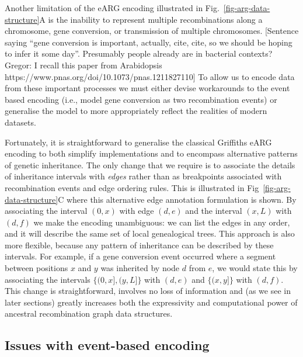 \documentclass{article}
\begin{document}
Another limitation of the eARG encoding illustrated in
Fig.~\ref{fig-arg-data-structure}A is the inability to represent
multiple recombinations along a chromosome, gene conversion,
or transmission of multiple chromosomes.
[Sentence saying ``gene conversion is important, actually, cite, cite,
so we should be hoping to infer it some day''. Presumably people
already are in bacterial contexts? Gregor: I recall this paper from
Arabidopsis https://www.pnas.org/doi/10.1073/pnas.1211827110]
To allow us to encode data from these important processes we
must either devise workarounds to the event based encoding
(i.e., model gene conversion as two recombination events) or
generalise the model to more appropriately reflect the realities
of modern datasets.

Fortunately, it is straightforward to generalise the classical Griffiths
eARG encoding to both simplify implementations and to encompass
alternative patterns of genetic inheritance.
The only change that we require is to associate
the details of inheritance intervals with \emph{edges} rather than
as breakpoints associated with recombination events and
edge ordering rules. This is illustrated in Fig~\ref{fig-arg-data-structure}C
where this alternative edge annotation formulation is
shown. By associating the interval $(0, x)$ with edge $(d,e)$
and the interval $(x, L)$ with $(d, f)$ we make the encoding
unambiguous: we can list the edges in any order, and it
will describe the same set of local genealogical trees.
This approach is also more flexible, because any pattern
of inheritance can be described by these intervals. For
example, if a gene conversion event occurred where a segment
between positions $x$ and $y$ was inherited by
node $d$ from $e$, we would state this by associating
the intervals $\{(0, x], (y, L]\}$ with $(d,e)$ and
$\{(x, y]\}$ with $(d,f)$.
This change is straightforward, involves no loss of information
and (as we see in later sections)
greatly increases both the expressivity and computational
power of ancestral recombination graph data structures.

\subsection*{Issues with event-based encoding}
\end{document}
